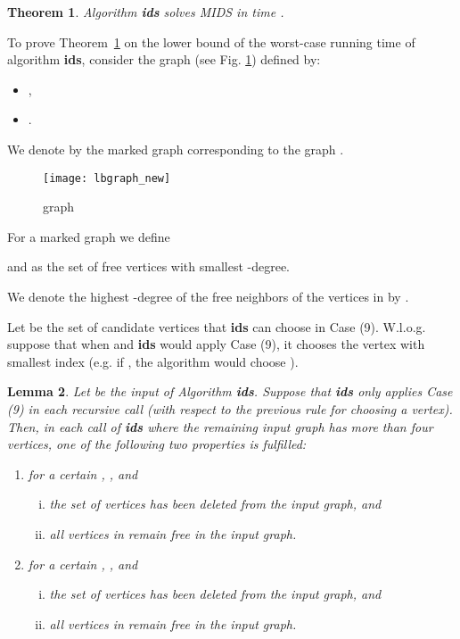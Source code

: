 \documentclass[a4paper,10pt]{article}
\theoremstyle{plain}
\newtheorem{theorem}{Theorem}
\newtheorem{lemma}[theorem]{Lemma}
\theoremstyle{definition}
\theoremstyle{remark}
\newcommand{\MIDSpb}{\textsc{MIDS}\xspace}
\begin{document}
\begin{theorem}
\label{lowerbound}
Algorithm {\bf ids} solves \MIDSpb in time .
\end{theorem}


To prove Theorem~\ref{lowerbound} on the lower bound of the worst-case running time of
algorithm {\bf ids},
consider the graph  (see Fig. \ref{lbgraph}) defined by:
\begin{itemize}
\item ,
\item .
\end{itemize}

We denote by  the marked graph corresponding
to the graph .

\begin{figure}
\centering
      \texttt{[image: lbgraph\_new]}
      \caption{\label{lbgraph}graph }
\end{figure}


For a marked graph  we define

and
 as the set of free vertices
with smallest -degree.

We denote the highest -degree of the free neighbors of the vertices in  by
.

Let 
be the set of candidate
vertices that {\bf ids} can choose in Case (9).
W.l.o.g. suppose that when  and {\bf ids} would
apply Case (9), it chooses the vertex
with smallest index (e.g. if , the algorithm would
choose ).


\begin{lemma}\label{LBLemma1}
Let  be the input of Algorithm {\bf ids}.
Suppose that {\bf ids} only applies Case (9) in each recursive call
(with respect to the previous rule for choosing a vertex).
Then, in each call of {\bf ids} where the remaining input graph has more
than four vertices, one of the following two properties is fulfilled:

\begin{enumerate}[(1)]
\item  for a certain , , and
\begin{enumerate}[(i)]
\item the set of vertices  has been deleted from
the input graph, and
\item all vertices in  remain free in
the input graph.
\end{enumerate}

\item  for a certain , , and
\begin{enumerate}[(i)]
\item the set of vertices  has
been deleted from the input graph, and
\item all vertices in  remain
free in the input graph.
\end{enumerate}
\end{enumerate}
\end{lemma}
\end{document}
